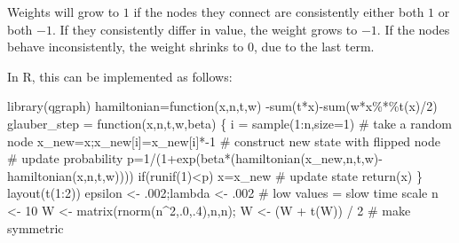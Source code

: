 \documentclass[
  a4paper,
  DIV=11,
  numbers=noendperiod,
  oneside]{scrreprt}
\newenvironment{Shaded}{}{}
\newcommand{\AttributeTok}[1]{\textcolor[rgb]{0.84,0.23,0.29}{#1}}
\newcommand{\CommentTok}[1]{\textcolor[rgb]{0.42,0.45,0.49}{#1}}
\newcommand{\ControlFlowTok}[1]{\textcolor[rgb]{0.84,0.23,0.29}{#1}}
\newcommand{\DecValTok}[1]{\textcolor[rgb]{0.00,0.36,0.77}{#1}}
\newcommand{\FunctionTok}[1]{\textcolor[rgb]{0.44,0.26,0.76}{#1}}
\newcommand{\NormalTok}[1]{\textcolor[rgb]{0.14,0.16,0.18}{#1}}
\newcommand{\OtherTok}[1]{\textcolor[rgb]{0.44,0.26,0.76}{#1}}
\newcommand{\SpecialCharTok}[1]{\textcolor[rgb]{0.00,0.36,0.77}{#1}}
\begin{document}
Weights will grow to \(1\) if the nodes they connect are consistently
either both \(1\) or both \(-1\). If they consistently differ in value,
the weight grows to \(-1\). If the nodes behave inconsistently, the
weight shrinks to \(0\), due to the last term.

In R, this can be implemented as follows:

\begin{Shaded}
\begin{Highlighting}[]
\FunctionTok{library}\NormalTok{(qgraph)}
\NormalTok{hamiltonian}\OtherTok{=}\ControlFlowTok{function}\NormalTok{(x,n,t,w) }\SpecialCharTok{{-}}\FunctionTok{sum}\NormalTok{(t}\SpecialCharTok{*}\NormalTok{x)}\SpecialCharTok{{-}}\FunctionTok{sum}\NormalTok{(w}\SpecialCharTok{*}\NormalTok{x}\SpecialCharTok{\%*\%}\FunctionTok{t}\NormalTok{(x)}\SpecialCharTok{/}\DecValTok{2}\NormalTok{)}
\NormalTok{glauber\_step }\OtherTok{=} \ControlFlowTok{function}\NormalTok{(x,n,t,w,beta)}
\NormalTok{\{}
\NormalTok{  i }\OtherTok{=} \FunctionTok{sample}\NormalTok{(}\DecValTok{1}\SpecialCharTok{:}\NormalTok{n,}\AttributeTok{size=}\DecValTok{1}\NormalTok{) }\CommentTok{\# take a random node}
\NormalTok{  x\_new}\OtherTok{=}\NormalTok{x;x\_new[i]}\OtherTok{=}\NormalTok{x\_new[i]}\SpecialCharTok{*{-}}\DecValTok{1} \CommentTok{\# construct new state with flipped node}
  \CommentTok{\# update probability}
\NormalTok{  p}\OtherTok{=}\DecValTok{1}\SpecialCharTok{/}\NormalTok{(}\DecValTok{1}\SpecialCharTok{+}\FunctionTok{exp}\NormalTok{(beta}\SpecialCharTok{*}\NormalTok{(}\FunctionTok{hamiltonian}\NormalTok{(x\_new,n,t,w)}\SpecialCharTok{{-}}\FunctionTok{hamiltonian}\NormalTok{(x,n,t,w))))  }
  \ControlFlowTok{if}\NormalTok{(}\FunctionTok{runif}\NormalTok{(}\DecValTok{1}\NormalTok{)}\SpecialCharTok{\textless{}}\NormalTok{p) x}\OtherTok{=}\NormalTok{x\_new }\CommentTok{\# update state}
  \FunctionTok{return}\NormalTok{(x)}
\NormalTok{\}}
\FunctionTok{layout}\NormalTok{(}\FunctionTok{t}\NormalTok{(}\DecValTok{1}\SpecialCharTok{:}\DecValTok{2}\NormalTok{))}
\NormalTok{epsilon }\OtherTok{\textless{}{-}}\NormalTok{ .}\DecValTok{002}\NormalTok{;lambda }\OtherTok{\textless{}{-}}\NormalTok{ .}\DecValTok{002} \CommentTok{\# low values = slow time scale}
\NormalTok{n }\OtherTok{\textless{}{-}} \DecValTok{10}
\NormalTok{W }\OtherTok{\textless{}{-}} \FunctionTok{matrix}\NormalTok{(}\FunctionTok{rnorm}\NormalTok{(n}\SpecialCharTok{\^{}}\DecValTok{2}\NormalTok{,.}\DecValTok{0}\NormalTok{,.}\DecValTok{4}\NormalTok{),n,n); }
\NormalTok{W }\OtherTok{\textless{}{-}}\NormalTok{ (W }\SpecialCharTok{+} \FunctionTok{t}\NormalTok{(W)) }\SpecialCharTok{/} \DecValTok{2} \CommentTok{\# make symmetric}

\end{Highlighting}
\end{Shaded}
\end{document}

